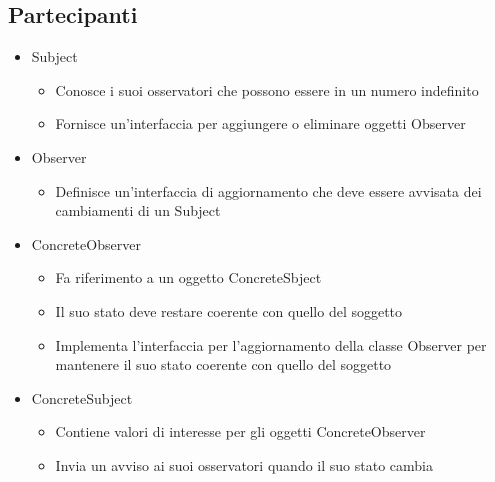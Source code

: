 \subsection*{Partecipanti}
\begin{itemize}
    \item Subject \begin{itemize}
        \item Conosce i suoi osservatori che possono essere in un numero indefinito
        \item Fornisce un'interfaccia per aggiungere o eliminare oggetti Observer
    \end{itemize}
    \item Observer \begin{itemize}
        \item Definisce un'interfaccia di aggiornamento che deve essere avvisata dei cambiamenti di
        un Subject
    \end{itemize}
    \item ConcreteObserver \begin{itemize}
        \item Fa riferimento a un oggetto ConcreteSbject
        \item Il suo stato deve restare coerente con quello del soggetto
        \item Implementa l'interfaccia per l'aggiornamento della classe Observer per
        mantenere il suo stato coerente con quello del soggetto
    \end{itemize}
    \item ConcreteSubject \begin{itemize}
        \item Contiene valori di interesse per gli oggetti ConcreteObserver
        \item Invia un avviso ai suoi osservatori quando il suo stato cambia
    \end{itemize}
\end{itemize}

